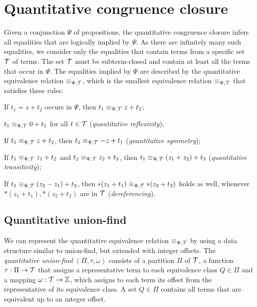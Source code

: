 \section{Quantitative congruence closure}\label{chapter:qcc}

Given a conjunction $\Psi$ of propositions, the quantitative congruence closure infers all equalities that are logically implied by $\Psi$.
As there are infinitely many such equalities, we consider only the equalities that contain terms from a specific set $\mathcal{T}$ of terms.
The set $\mathcal{T}$ must be subterm-closed and contain at least all the terms that occur in $\Psi$.
The equalities implied by $\Psi$ are described by the quantitative equivalence relation $\equiv_{\Psi,\mathcal{T}}$,
which is the smallest equivalence relation $\equiv_{\Psi,\mathcal{T}}$ that satisfies these rules:
\begin{enumerate}[label={[E\arabic*]}, ref={[E\arabic*]}]
  \setcounter{enumi}{-1}
\item\label{item:persistence} If $t_1 = z+t_2$ occurs in $\Psi$, then $t_1 \equiv_{\Psi,\mathcal{T}} z+t_2$;
\item\label{item:quantitative-reflexivity} $t_1 \equiv_{\Psi,\mathcal{T}} 0+t_1$ for all $t\in\mathcal{T}$ (\emph{quantitative reflexivity});
\item\label{item:quantitative-symmetry} If $t_1 \equiv_{\Psi,\mathcal{T}} z+t_2$, then $t_2 \equiv_{\Psi,\mathcal{T}} -z+t_1$ (\emph{quantitative symmetry});
\item\label{item:quantitative-transitivity} If $t_1 \equiv_{\Psi,\mathcal{T}} z_1+t_2$ and $t_2 \equiv_{\Psi,\mathcal{T}} z_2 + t_3$,
		then $t_1 \equiv_{\Psi,\mathcal{T}} (z_1+z_2)+t_3$ (\emph{quantitative transitivity});
\item\label{item:dereferencing} If $t_1 \equiv_{\Psi,\mathcal{T}} (z_2 - z_1) + t_2$, then $*(z_1 + t_1) \equiv_{\Psi,\mathcal{T}} *(z_2 + t_2)$ holds as well, whenever $*(z_1 + t_1),  *(z_2 + t_2)$ are in $\mathcal{T}$ (\emph{dereferencing}).
\end{enumerate}

\subsection{Quantitative union-find}\label{subsection:quantitative-union-find}

We can represent the quantitative equivalence relation $\equiv_{\Psi,\mathcal{T}}$ by using a data structure similar to union-find, but extended with integer offsets.
The \emph{quantitative union-find} $(\Pi, \tau, \omega)$ consists of a partition $\Pi$ of $\mathcal{T}$,
a function $\tau : \Pi \rightarrow \mathcal{T}$ that assigns a representative term to each equivalence class $Q \in \Pi$ and a mapping $\omega : \mathcal{T} \rightarrow \mathbb{Z}$,
which assigns to each term its offset from the representative of its equivalence class.
A set $Q \in \Pi$ contains all terms that are equivalent up to an integer offset.

